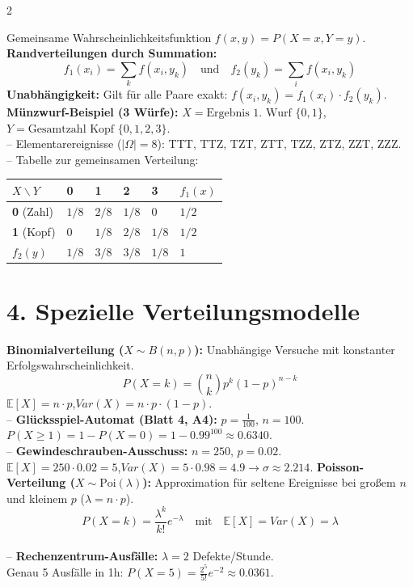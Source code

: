 \documentclass[a4paper, 9pt]{extarticle}
\begin{document}
\begin{multicols*}{2}
\begin{tcolorbox}[title={Zweidimensionale Zufallsvariablen}, colframe=varorange, colback=varorange!5, colbacktitle=varorange]
Gemeinsame Wahrscheinlichkeitsfunktion $f(x,y) = P(X=x, Y=y)$.
\\\textbf{Randverteilungen durch Summation:}
$$f_1(x_i) = \sum_{k} f(x_i, y_k) \quad \text{und} \quad f_2(y_k) = \sum_{i} f(x_i, y_k)$$
\textbf{Unabhängigkeit:} Gilt für alle Paare exakt: $f(x_i, y_k) = f_1(x_i) \cdot f_2(y_k)$.
\smallskip
\textbf{Münzwurf-Beispiel (3 Würfe):} $X = \text{Ergebnis 1. Wurf } \{0,1\}$, $Y = \text{Gesamtzahl Kopf } \{0,1,2,3\}$.
\\-- Elementarereignisse ($|\Omega|=8$): TTT, TTZ, TZT, ZTT, TZZ, ZTZ, ZZT, ZZZ.
\\-- Tabelle zur gemeinsamen Verteilung:
\begin{tabularx}{\linewidth}{@{}lXXXX|l@{}}
\toprule
$X \backslash Y$ & \textbf{0} & \textbf{1} & \textbf{2} & \textbf{3} & \textbf{$f_1(x)$} \\
\midrule
\textbf{0} (Zahl) & $1/8$ & $2/8$ & $1/8$ & $0$ & $1/2$ \\
\textbf{1} (Kopf) & $0$ & $1/8$ & $2/8$ & $1/8$ & $1/2$ \\
\midrule
\textbf{$f_2(y)$} & $1/8$ & $3/8$ & $3/8$ & $1/8$ & $1$ \\
\bottomrule
\end{tabularx}
\end{tcolorbox}

\section*{4. Spezielle Verteilungsmodelle}

\begin{tcolorbox}[title={Diskrete Modelle: Binomial \& Poisson}, colframe=distred, colback=distred!5, colbacktitle=distred]
\textbf{Binomialverteilung ($X \sim B(n,p)$):} Unabhängige Versuche mit konstanter Erfolgswahrscheinlichkeit.
$$P(X = k) = \binom{n}{k} p^k (1-p)^{n-k}$$
$\mathbb{E}[X] = n \cdot p$,\quad $Var(X) = n \cdot p \cdot (1-p)$.
\\-- \textbf{Glücksspiel-Automat (Blatt 4, A4):} $p = \frac{1}{100}$, $n = 100$.
\\$P(X \ge 1) = 1 - P(X=0) = 1 - 0.99^{100} \approx 0.6340$.
\\-- \textbf{Gewindeschrauben-Ausschuss:} $n=250$, $p=0.02$.
\\$\mathbb{E}[X] = 250 \cdot 0.02 = 5$,\quad $Var(X) = 5 \cdot 0.98 = 4.9 \rightarrow \sigma \approx 2.214$.
\smallskip
\textbf{Poisson-Verteilung ($X \sim \text{Poi}(\lambda)$):} Approximation für seltene Ereignisse bei großem $n$ und kleinem $p$ ($\lambda = n \cdot p$).
$$P(X = k) = \frac{\lambda^k}{k!} e^{-\lambda} \quad \text{mit} \quad \mathbb{E}[X] = Var(X) = \lambda$$
\\-- \textbf{Rechenzentrum-Ausfälle:} $\lambda = 2$ Defekte/Stunde.
\\Genau 5 Ausfälle in 1h: $P(X=5) = \frac{2^5}{5!} e^{-2} \approx 0.0361$.
\end{tcolorbox}


\end{multicols*}
\end{document}
